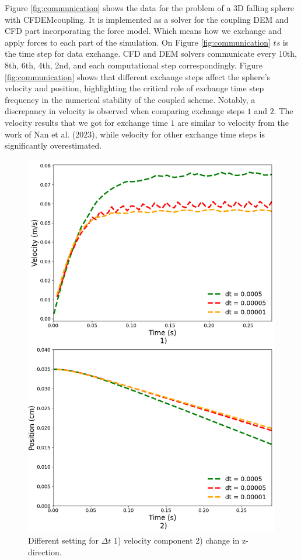 Figure \ref{fig:communication} shows the data for the problem of a 3D falling sphere with CFDEMcoupling. It is implemented as a solver for the coupling DEM and CFD part incorporating the force model. Which means how we exchange and apply forces to each part of the simulation. On Figure \ref{fig:communication} $ts$ is the time step for data exchange. CFD and DEM solvers communicate every 10th, 8th, 6th, 4th, 2nd, and each computational step correspondingly. Figure \ref{fig:communication} shows that different exchange steps affect the sphere's velocity and position, highlighting the critical role of exchange time step frequency in the numerical stability of the coupled scheme. Notably, a discrepancy in velocity is observed when comparing exchange steps $1$ and $2$. The velocity results that we got for exchange time $1$ are similar to velocity from the work of Nan et al. (2023)\cite{nan2023high}, while velocity for other exchange time steps is significantly overestimated.

\begin{figure}[H]
    \centering
    \includegraphics[width=12cm]{Images/chap3/nan_simulation_192000_cells_dt_different.png }
    \caption{ Different setting for $\Delta t$ 1) velocity component 2) change in z-direction.}
    \label{fig:diff_dt}
\end{figure}

